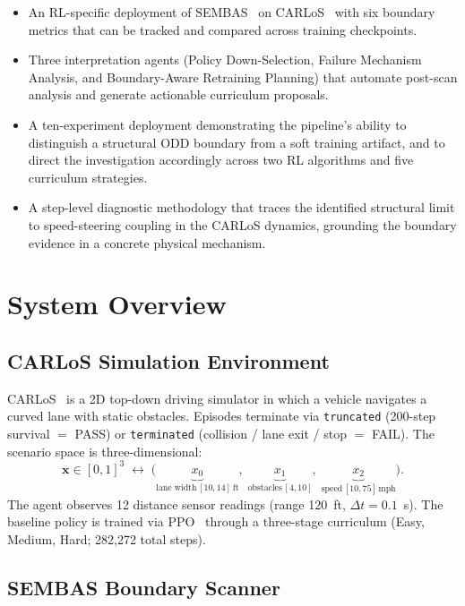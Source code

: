 \documentclass[conference]{IEEEtran}
\begin{document}
\begin{itemize}
\item An RL-specific deployment of SEMBAS~\cite{b1} on CARLoS~\cite{b2}
with six boundary metrics that can be tracked and compared across training
checkpoints.
\item Three interpretation agents (Policy Down-Selection, Failure Mechanism
Analysis, and Boundary-Aware Retraining Planning) that automate post-scan
analysis and generate actionable curriculum proposals.
\item A ten-experiment deployment demonstrating the pipeline's ability to
distinguish a structural ODD boundary from a soft training artifact, and to
direct the investigation accordingly across two RL algorithms and five
curriculum strategies.
\item A step-level diagnostic methodology that traces the identified structural
limit to speed-steering coupling in the CARLoS dynamics, grounding the
boundary evidence in a concrete physical mechanism.
\end{itemize}

\section{System Overview}

\subsection{CARLoS Simulation Environment}

CARLoS~\cite{b2} is a 2D top-down driving simulator in which a vehicle
navigates a curved lane with static obstacles. Episodes terminate via
\texttt{truncated} (200-step survival $=$ PASS) or \texttt{terminated}
(collision / lane exit / stop $=$ FAIL). The scenario space is
three-dimensional:
\begin{equation}
\mathbf{x} \in [0,1]^3 \;\leftrightarrow\;
\bigl(
  \underbrace{x_0}_{\text{lane width}\,[10,14]\,\text{ft}},\;
  \underbrace{x_1}_{\text{obstacles}\,[4,10]},\;
  \underbrace{x_2}_{\text{speed}\,[10,75]\,\text{mph}}
\bigr).
\end{equation}
The agent observes 12 distance sensor readings (range 120~ft,
$\Delta t = 0.1$~s). The baseline policy is trained via PPO~\cite{b5} through
a three-stage curriculum (Easy, Medium, Hard; 282,272 total steps).

\subsection{SEMBAS Boundary Scanner}
\end{document}

